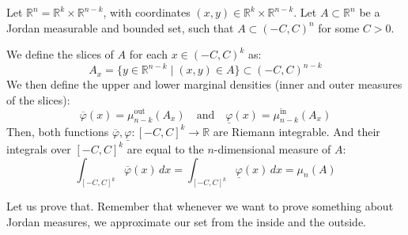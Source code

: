 \begin{nice-box}
\begin{theorem}
Let $\mathbb{R}^n = \mathbb{R}^k \times \mathbb{R}^{n-k}$, with coordinates $(x,y) \in \mathbb{R}^k \times \mathbb{R}^{n-k}$.
Let $A \subset \mathbb{R}^n$ be a Jordan measurable and bounded set, such that $A \subset (-C,C)^n$ for some $C > 0$.

We define the slices of $A$ for each $x \in (-C,C)^k$ as:
\[
A_x = \{ y \in \mathbb{R}^{n-k} \mid (x,y) \in A \} \subset (-C,C)^{n-k}
\]
We then define the upper and lower marginal densities (inner and outer measures of the slices):
\[
\overline{\varphi}(x) = \mu_{n-k}^{\text{out}}(A_x) \quad \text{and} \quad \underline{\varphi}(x) = \mu_{n-k}^{\text{in}}(A_x)
\]
Then, both functions $\overline{\varphi}, \underline{\varphi}: [-C,C]^k \to \mathbb{R}$ are Riemann integrable.
And their integrals over $[-C,C]^k$ are equal to the $n$-dimensional measure of $A$:
\[
\int_{[-C,C]^k} \overline{\varphi}(x) \, dx = \int_{[-C,C]^k} \underline{\varphi}(x) \, dx = \mu_n(A)
\]
\end{theorem}
\end{nice-box}

\begin{spoken-clean}[00:03:37 - 00:04:08]
Let us prove that. Remember that whenever we want to prove something about Jordan measures, we approximate our set from the inside and the outside.
\end{spoken-clean}

